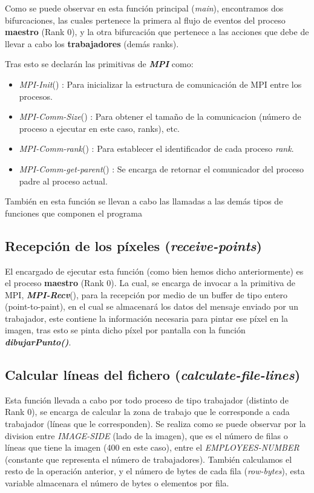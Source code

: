 \documentclass[11pt]{article}
\begin{document}
Como se puede observar en esta función principal (\textit{main}), encontramos dos bifurcaciones, las cuales pertenece la primera al flujo de eventos del proceso \textbf{maestro} (Rank 0), y la otra bifurcación que pertenece a las acciones que debe de llevar a cabo los \textbf{trabajadores} (demás ranks).


Tras esto se declarán las primitivas de \textit{\textbf{MPI}} como: 
\begin{itemize}
	\item \textit{MPI-Init}() \cite{mpi_init}: Para inicializar la estructura de comunicación de MPI entre los procesos. 
	\item \textit{MPI-Comm-Size}() \cite{mpi_size}: Para obtener el tamaño de la comunicacion (número de proceso a ejecutar en este caso, ranks), etc.
	\item \textit{MPI-Comm-rank}() \cite{mpi_rank}: Para establecer el identificador de cada proceso \textit{rank}.
	\item \textit{MPI-Comm-get-parent}() \cite{mpi_rank}: Se encarga de retornar el comunicador del proceso padre al proceso actual.
\end{itemize}

También en esta función se llevan a cabo las llamadas a las demás tipos de funciones que componen el programa




\subsection{Recepción de los píxeles (\textit{receive-points})}
El encargado de ejecutar esta función (como bien hemos dicho anteriormente) es el proceso \textbf{maestro} (Rank 0). La cual, se encarga de invocar a la primitiva de MPI, \textbf{\textit{MPI-Recv}}(), para la recepción por medio de un buffer de tipo entero (point-to-paint), en el cual se almacenará los datos del mensaje enviado por un trabajador, este contiene la información necesaria para pintar ese píxel en la imagen, tras esto se pinta dicho píxel por pantalla con la función \textit{\textbf{dibujarPunto()}}.




\subsection{Calcular líneas del fichero (\textit{calculate-file-lines})}
Esta función llevada a cabo por todo proceso de tipo trabajador (distinto de Rank 0), se encarga de calcular la zona de trabajo que le corresponde a cada trabajador (líneas que le corresponden). Se realiza como se puede observar por la division entre \textit{IMAGE-SIDE} (lado de la imagen), que es el número de filas o líneas que tiene la imagen (400 en este caso), entre el \textit{EMPLOYEES-NUMBER} (constante que representa el número de trabajadores). También calculamos el resto de la operación anterior, y el número de bytes de cada fila (\textit{row-bytes}), esta variable almacenara el número de bytes o elementos por fila.
	
\end{document}
